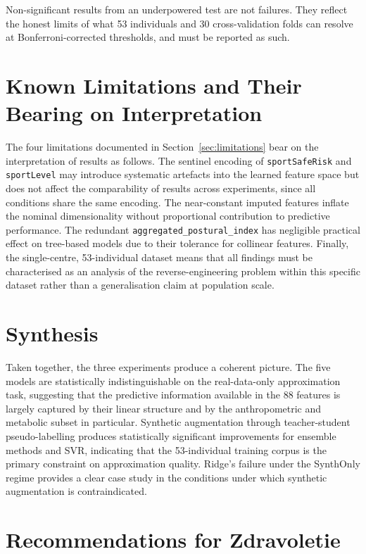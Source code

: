 \documentclass[11pt,a4paper]{report}
\begin{document}
Non-significant results from an underpowered test are not failures. They reflect the honest limits
of what 53 individuals and 30 cross-validation folds can resolve at Bonferroni-corrected thresholds,
and must be reported as such.

\section{Known Limitations and Their Bearing on Interpretation}

The four limitations documented in Section~\ref{sec:limitations} bear on the interpretation of results as follows.
The sentinel encoding of \texttt{sportSafeRisk} and \texttt{sportLevel} may introduce systematic
artefacts into the learned feature space but does not affect the comparability of results across
experiments, since all conditions share the same encoding. The near-constant imputed features
inflate the nominal dimensionality without proportional contribution to predictive performance. The
redundant \texttt{aggregated\_postural\_index} has negligible practical effect on tree-based models
due to their tolerance for collinear features. Finally, the single-centre, 53-individual dataset
means that all findings must be characterised as an analysis of the reverse-engineering problem
within this specific dataset rather than a generalisation claim at population scale.

\section{Synthesis}

Taken together, the three experiments produce a coherent picture. The five models are statistically
indistinguishable on the real-data-only approximation task, suggesting that the predictive
information available in the 88 features is largely captured by their linear structure and by the
anthropometric and metabolic subset in particular. Synthetic augmentation through teacher-student
pseudo-labelling produces statistically significant improvements for ensemble methods and SVR,
indicating that the 53-individual training corpus is the primary constraint on approximation
quality. Ridge's failure under the SynthOnly regime provides a clear case study in the conditions
under which synthetic augmentation is contraindicated.

\section{Recommendations for Zdravoletie}
\end{document}
